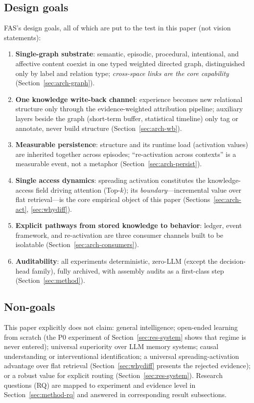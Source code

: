 \documentclass[10pt,a4paper]{article}
\begin{document}
\subsection{Design goals}
FAS's design goals, all of which are put to the test in this paper (not vision statements):
\begin{enumerate}
\item \textbf{Single-graph substrate}: semantic, episodic, procedural, intentional, and affective content coexist in one typed weighted directed graph, distinguished only by label and relation type; \emph{cross-space links are the core capability} (Section~\ref{sec:arch-graph}).
\item \textbf{One knowledge write-back channel}: experience becomes new relational structure only through the evidence-weighted attribution pipeline; auxiliary layers beside the graph (short-term buffer, statistical timeline) only tag or annotate, never build structure (Section~\ref{sec:arch-wb}).
\item \textbf{Measurable persistence}: structure and its runtime load (activation values) are inherited together across episodes; ``re-activation across contexts'' is a measurable event, not a metaphor (Section~\ref{sec:arch-persist}).
\item \textbf{Single access dynamics}: spreading activation constitutes the knowledge-access field driving attention (Top-$k$); its \emph{boundary}---incremental value over flat retrieval---is the core empirical object of this paper (Sections~\ref{sec:arch-act}, \ref{sec:whydiff}).
\item \textbf{Explicit pathways from stored knowledge to behavior}: ledger, event framework, and re-activation are three consumer channels built to be isolatable (Section~\ref{sec:arch-consumers}).
\item \textbf{Auditability}: all experiments deterministic, zero-LLM (except the decision-head family), fully archived, with assembly audits as a first-class step (Section~\ref{sec:method}).
\end{enumerate}

\subsection{Non-goals}
This paper explicitly does not claim: general intelligence; open-ended learning from scratch (the P0 experiment of Section~\ref{sec:res-system} shows that regime is never entered); universal superiority over LLM memory systems; causal understanding or interventional identification; a universal spreading-activation advantage over flat retrieval (Section~\ref{sec:whydiff} presents the rejected evidence); or a robust value for explicit routing (Section~\ref{sec:res-system}). Research questions (RQ) are mapped to experiment and evidence level in Section~\ref{sec:method-rq} and answered in corresponding result subsections.
\end{document}
